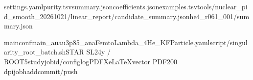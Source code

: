 \documentclass[10pt,a4paper]{article}
\begin{document}
\hspace{0pt}{\jpfont 再現ファイル：同梱}\hspace{0pt}settings.yaml\hspace{0pt}{\jpfont 、}\hspace{0pt}purity.tsv\hspace{0pt}{\jpfont 、}\hspace{0pt}summary.json\hspace{0pt}{\jpfont 、}\hspace{0pt}coefficients.json\hspace{0pt}{\jpfont 、}\hspace{0pt}examples.tsv\hspace{0pt}{\jpfont 。ツールは}\hspace{0pt}tools/\allowbreak{}nuclear\_\allowbreak{}pid\_\allowbreak{}smooth\_\allowbreak{}20261021/\allowbreak{}linear\_\allowbreak{}report/\allowbreak{}\hspace{0pt}{\jpfont 。元は}\hspace{0pt}candidate\_\allowbreak{}summary.json\hspace{0pt}{\jpfont と}\hspace{0pt}he4\_\allowbreak{}r061\_\allowbreak{}001/\allowbreak{}summary.json\hspace{0pt}{\jpfont 。}\hspace{0pt}

mainconf\hspace{0pt}{\jpfont ：}\hspace{0pt}main\_\allowbreak{}auau3p85\_\allowbreak{}anaFemtoLambda\_\allowbreak{}4He\_\allowbreak{}KFParticle.yaml\hspace{0pt}{\jpfont 。描画は}\hspace{0pt}script/\allowbreak{}singularity\_\allowbreak{}root\_\allowbreak{}batch.sh\hspace{0pt}{\jpfont 経由の}\hspace{0pt}STAR SL24y /\allowbreak{} ROOT5\hspace{0pt}{\jpfont 。ローカル}\hspace{0pt}study\hspace{0pt}{\jpfont のため新規}\hspace{0pt}jobid/\allowbreak{}configlog\hspace{0pt}{\jpfont なし。}\hspace{0pt}PDF\hspace{0pt}{\jpfont 組版は}\hspace{0pt}XeLaTeX\hspace{0pt}{\jpfont 。図の}\hspace{0pt}vector PDF\hspace{0pt}{\jpfont と}\hspace{0pt}200 dpi\hspace{0pt}{\jpfont 画像を両方保存。}\hspace{0pt}job\hspace{0pt}{\jpfont 投入・}\hspace{0pt}hadd\hspace{0pt}{\jpfont ・}\hspace{0pt}commit/\allowbreak{}push\hspace{0pt}{\jpfont なし。}\hspace{0pt}
\end{document}

